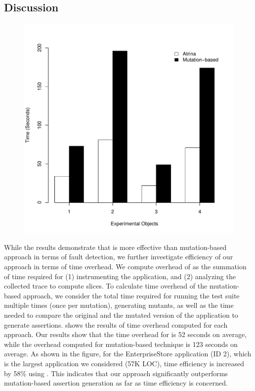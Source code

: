 \subsection{Discussion} \label{Sec:discussion}
\begin{figure}[!t]
  \centering
  \includegraphics[width=0.8\hsize]{r-scripts/performance}
  \label{Fig:performance}
\end{figure}
 While the results demonstrate that \atrina is more effective than mutation-based approach in terms of fault detection, we further investigate efficiency of our approach in terms of time overhead. 
We compute overhead of \atrina as the summation of time required for (1) instrumenting the application, and (2) analyzing the collected trace to compute \javascript slices. To calculate time overhead of the mutation-based approach, we consider the total time required for running the test suite multiple times (once per mutation), generating mutants, as well as the time needed to compare the original and the mutated version of the application to generate assertions.  shows the results of time overhead computed for each approach.    
Our results show that the time overhead for \atrina is 52 seconds on average, while the overhead computed for mutation-based technique is 123 seconds on average. As shown in the figure, for the EnterpriseStore application (ID 2), which is the largest application we considered (57K LOC), time efficiency is increased by 58\% using \atrina. This indicates that our approach significantly outperforms mutation-based assertion generation as far as time efficiency is concerned. 
